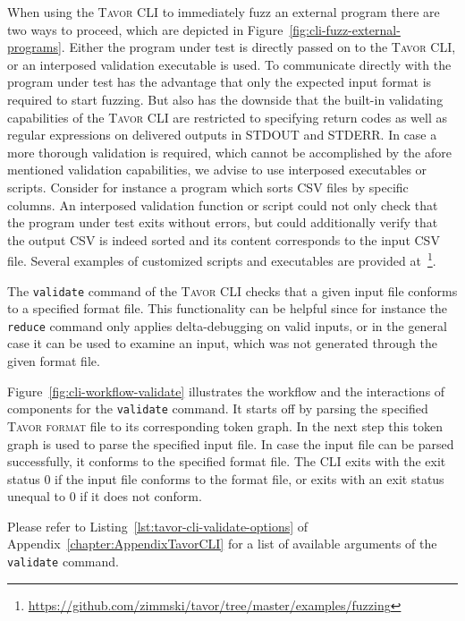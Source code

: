 When using the \textsc{Tavor CLI} to immediately fuzz an external program there are two ways to proceed, which are depicted in Figure~\ref{fig:cli-fuzz-external-programs}. Either the program under test is directly passed on to the \textsc{Tavor CLI}, or an interposed validation executable is used. To communicate directly with the program under test has the advantage that only the expected input format is required to start fuzzing. But also has the downside that the built-in validating capabilities of the \textsc{Tavor CLI} are restricted to specifying return codes as well as regular expressions on delivered outputs in STDOUT and STDERR. In case a more thorough validation is required, which cannot be accomplished by the afore mentioned validation capabilities, we advise to use interposed executables or scripts. Consider for instance a program which sorts CSV files by specific columns. An interposed validation function or script could not only check that the program under test exits without errors, but could additionally verify that the output CSV is indeed sorted and its content corresponds to the input CSV file. Several examples of customized scripts and executables are provided at~\footnote{\url{https://github.com/zimmski/tavor/tree/master/examples/fuzzing}}.

\label{sec:tavor-cli-validate}

The \texttt{validate} command of the \textsc{Tavor CLI} checks that a given input file conforms to a specified format file. This functionality can be helpful since for instance the \texttt{reduce} command only applies delta-debugging on valid inputs, or in the general case it can be used to examine an input, which was not generated through the given format file.

Figure~\ref{fig:cli-workflow-validate} illustrates the workflow and the interactions of components for the \texttt{validate} command. It starts off by parsing the specified \textsc{Tavor format} file to its corresponding token graph. In the next step this token graph is used to parse the specified input file. In case the input file can be parsed successfully, it conforms to the specified format file. The CLI exits with the exit status $0$ if the input file conforms to the format file, or exits with an exit status unequal to $0$ if it does not conform.

Please refer to Listing~\ref{lst:tavor-cli-validate-options} of Appendix~\ref{chapter:AppendixTavorCLI} for a list of available arguments of the \texttt{validate} command.

